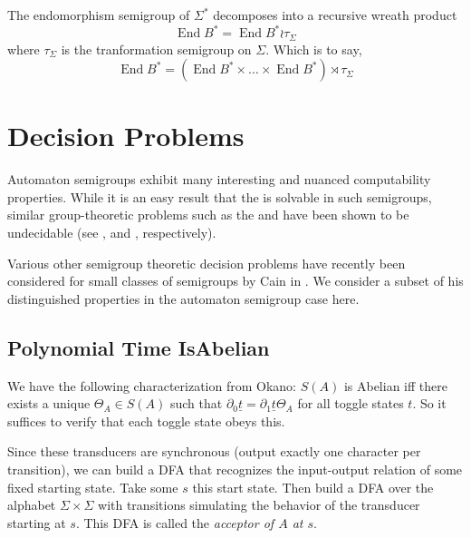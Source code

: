 \documentclass[11pt]{article}
\begin{document}
The endomorphism semigroup of $\Sigma^*$ decomposes into a recursive
wreath product
\[
  \operatorname{End}B^* = \operatorname{End}B^* \wr \tau_\Sigma
\]
where $\tau_\Sigma$ is the tranformation semigroup on $\Sigma$. Which
is to say,
\[
  \operatorname{End}B^* = (\operatorname{End}B^* \times \ldots \times
  \operatorname{End}B^* ) \rtimes \tau_\Sigma
\]



\section{Decision Problems}

Automaton semigroups exhibit many interesting and nuanced
computability properties. While it is an easy result that the
 is solvable in such semigroups, similar
group-theoretic problems such as the  and
 have been shown to be undecidable
(see \cite{sunic:conj}, and \cite{gillibert:finite}, respectively).

Various other semigroup theoretic decision problems have recently been
considered for small classes of semigroups by Cain in
\cite{Cain09:dec_prob}. We consider a subset of his distinguished
properties in the automaton semigroup case here.


\subsection{Polynomial Time IsAbelian}

We have the following characterization from Okano: $S(A)$ is Abelian
iff there exists a unique $\Theta_A \in S(A)$ such that
$\partial_0 \underline{t} = \partial_1 \underline{t} \Theta_A$ for all
toggle states $t$. So it suffices to verify that each toggle state
obeys this.

Since these transducers are synchronous (output exactly one character
per transition), we can build a DFA that recognizes the input-output
relation of some fixed starting state. Take some $s$ this start
state. Then build a DFA over the alphabet $\Sigma \times \Sigma$ with
transitions simulating the behavior of the transducer starting at
$s$. This DFA is called the \textit{acceptor of $A$ at $s$}.
\end{document}
